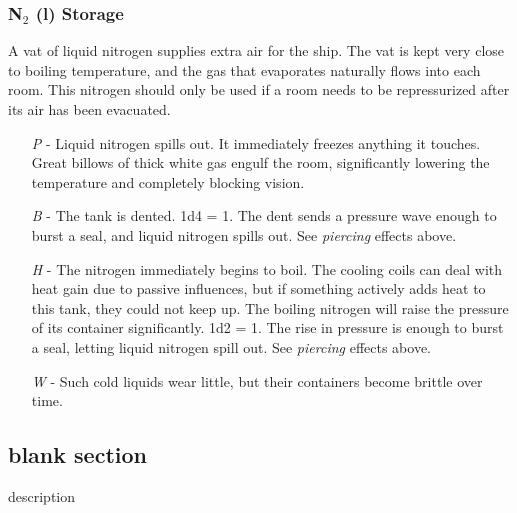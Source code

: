 \documentclass[a4paper]{article}
\begin{document}
\vspace{-0.5cm} \hspace{-18pt} \subsubsection{N$_2$ (l) Storage} \label{life_n2_storage} \vspace{-0.2cm}
A vat of liquid nitrogen supplies extra air for the ship. The vat is kept very close to boiling temperature, and the gas that evaporates naturally flows into each room. This nitrogen should only be used if a room needs to be repressurized after its air has been evacuated.
\begin{enumerate}
\item [\textit{P}] - Liquid nitrogen spills out. It immediately freezes anything it touches. Great billows of thick white gas engulf the room, significantly lowering the temperature and completely blocking vision.
\item [\textit{B}] - The tank is dented. \newline \hspace*{3pt} 1d4 = 1. The dent sends a pressure wave enough to burst a seal, and liquid nitrogen spills out. See \textit{piercing} effects above.
\item [\textit{H}] - The nitrogen immediately begins to boil. The cooling coils can deal with heat gain due to passive influences, but if something actively adds heat to this tank, they could not keep up. The boiling nitrogen will raise the pressure of its container significantly. \newline \hspace{-3pt} 1d2 = 1. The rise in pressure is enough to burst a seal, letting liquid nitrogen spill out. See \textit{piercing} effects above.
\item [\textit{W}] - Such cold liquids wear little, but their containers become brittle over time.
\end{enumerate}













\subsection{blank section} \label{blank}

description
\end{document}
